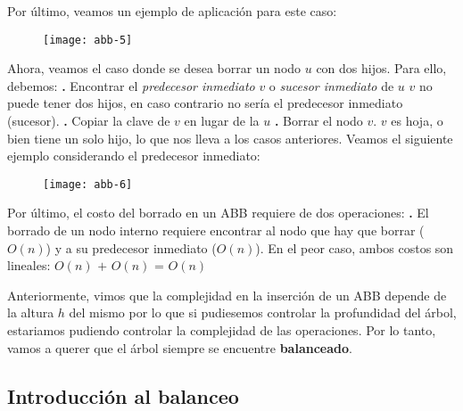 \documentclass[10pt,a4paper]{article}
\begin{document}
Por último, veamos un ejemplo de aplicación para este caso:

\begin{figure}[h]
	\centering
\texttt{[image: abb-5]}
	\label{drivers1}
\end{figure}

Ahora, veamos el caso donde se desea borrar un nodo $u$ con dos hijos. Para ello, debemos:
\newline
\newline
\textbf{.} Encontrar el \textit{predecesor inmediato} $v$ o \textit{sucesor inmediato} de $u$
\newline
\newline
$v$ no puede tener dos hijos, en caso contrario no sería el predecesor inmediato (sucesor).
\newline
\newline
\textbf{.} Copiar la clave de $v$ en lugar de la $u$
\newline
\newline
\textbf{.} Borrar el nodo $v$. $v$ es hoja, o bien tiene un solo hijo, lo que nos lleva a los casos anteriores.
\newline
\newline
Veamos el siguiente ejemplo considerando el predecesor inmediato:

\begin{figure}[h]
	\centering
\texttt{[image: abb-6]}
	\label{drivers1}
\end{figure}

Por último, el costo del borrado en un ABB requiere de dos operaciones:
\newline
\newline
\textbf{.} El borrado de un nodo interno requiere encontrar al nodo que hay que borrar ($O(n)$) y a su predecesor inmediato ($O(n)$).
\newline
\newline
En el peor caso, ambos costos son lineales: $O(n)$ $+$ $O(n)$ = $O(n)$
\newpage

Anteriormente, vimos que la complejidad en la inserción de un ABB depende de la altura $h$ del mismo por lo que si pudiesemos controlar la profundidad del árbol, estariamos pudiendo controlar la complejidad de las operaciones. Por lo tanto, vamos a querer que el árbol siempre se encuentre \textbf{balanceado}. 

\subsection{Introducción al balanceo}
\end{document}
